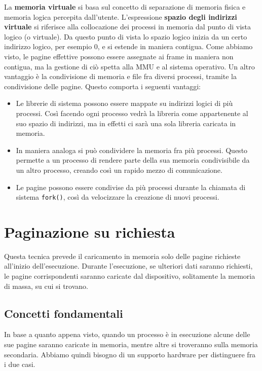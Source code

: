     La \textbf{memoria virtuale} si basa sul concetto di separazione di memoria fisica e memoria logica percepita dall'utente. L'espressione \textbf{spazio degli indirizzi virtuale} si riferisce alla collocazione dei processi in memoria dal punto di vista logico (o virtuale). Da questo punto di vista lo spazio logico inizia da un certo indirizzo logico, per esempio 0, e si estende in maniera contigua. Come abbiamo visto, le pagine effettive possono essere assegnate ai frame in maniera non contigua, ma la gestione di ciò spetta alla MMU e al sistema operativo. Un altro vantaggio è la condivisione di memoria e file fra diversi processi, tramite la condivisione delle pagine. Questo comporta i seguenti vantaggi:
    \begin{itemize}
        \item Le librerie di sistema possono essere mappate su indirizzi logici di più processi. Così facendo ogni processo vedrà la libreria come appartenente al suo spazio di indirizzi, ma in effetti ci sarà una sola libreria caricata in memoria.
        
        \item In maniera analoga si può condividere la memoria fra più processi. Questo permette a un processo di rendere parte della sua memoria condivisibile da un altro processo, creando così un rapido mezzo di comunicazione.
        
        \item Le pagine possono essere condivise da più processi durante la chiamata di sistema \texttt{fork()}, così da velocizzare la creazione di nuovi processi.
    \end{itemize}
    
\section{Paginazione su richiesta}
    Questa tecnica prevede il caricamento in memoria solo delle pagine richieste all'inizio dell'esecuzione. Durante l'esecuzione, se ulteriori dati saranno richiesti, le pagine corrispondenti saranno caricate dal dispositivo, solitamente la memoria di massa, su cui si trovano.
    
    \subsection{Concetti fondamentali}
        In base a quanto appena visto, quando un processo è in esecuzione alcune delle sue pagine saranno caricate in memoria, mentre altre si troveranno sulla memoria secondaria. Abbiamo quindi bisogno di un supporto hardware per distinguere fra i due casi.
        
